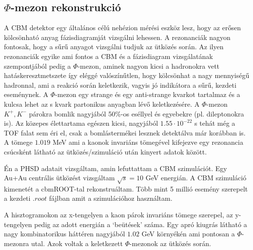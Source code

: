 \documentclass[a4paper,12pt]{article}
\begin{document}
\subsection{ $\Phi$-mezon rekonstrukció}
\vspace{5mm}
\par A CBM detektor egy általános célú nehézion mérési eszköz lesz, hogy az erősen kölcsönható anyag fázisdiagramját vizsgálni lehessen. A
rezonanciák nagyon fontosak, hogy a sűrű anyagot vizsgálni tudjuk az ütközés során. Az ilyen rezonanciák egyike ami fontos a CBM és a 
fázisdiagram vizsgálatának szempontjából pedig a $\Phi$-mezon, aminek nagyon kicsi a hadronokra vett hatáskeresztmetszete így eléggé 
valószínűtlen, hogy kölcsönhat a nagy mennyiségű hadronnal, ami a reakció során keletkezik, vagyis jó indikátora a sűrű, kezdeti eseménynek.
A $\Phi$-mezon egy strange és egy anti-strange kvarkot tartalmaz és a kulcsa lehet az s kvark partonikus anyagban lévő keletkezésére. A
$\Phi$-mezon $K^{+}, K^{-}$ párokra bomlik nagyjából 50$\%$-os eséllyel és egyebekre (pl. dileptonokra is). Az közepes élettartama egészen
kicsi, nagyjából $1.55\cdot10^{-22}$ s tehát még a TOF falat sem éri el, csak a bomlástermékei lesznek detektálva már korábban is. 
A tömege $1.019$ MeV ami a kaonok invariáns tömegével kifejezve egy rezonancia csúcsként látható az ütközés/szimuláció után kinyert 
adatok között. 
\vspace{5mm}
\par Én a PHSD adatait vizsgáltam, amin lefuttattam a CBM szimulációt. Egy Au+Au centrális ütközést vizsgáltam $\sqrt{s} = 10$ GeV energián. 
A CBM szimuláció kimenetét a cbmROOT-tal rekonstruáltam. Több mint 5 millió esemény szerepelt a kezdeti $.root$ fájlban amit a szimulációhoz 
használtam.
\vspace{5mm}
\par A hisztogramokon az x-tengelyen a kaon párok invariáns tömege szerepel, az y-tengelyen pedig az adott energián a `beütések' száma. Egy 
apró kiugrás látható a nagy kombinatorikus háttéren nagyjából $1.02$ GeV környékén ami pontosan a $\Phi$-mezonra utal. Azok voltak
a keletkezett $\Phi$-mezonok az ütközés során. 
\end{document}
